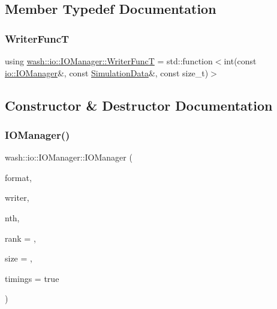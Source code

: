 \subsection{Member Typedef Documentation}
\mbox{\label{classwash_1_1io_1_1IOManager_aeda8c39a8e3c748efd1b3e0f8ae823ee}} 
\subsubsection{\texorpdfstring{Writer\+FuncT}{WriterFuncT}}
{\footnotesize\ttfamily using \mbox{\hyperlink{classwash_1_1io_1_1IOManager_aeda8c39a8e3c748efd1b3e0f8ae823ee}{wash\+::io\+::\+I\+O\+Manager\+::\+Writer\+FuncT}} =  std\+::function$<$int(const \mbox{\hyperlink{classwash_1_1io_1_1IOManager}{io\+::\+I\+O\+Manager}}\&, const \mbox{\hyperlink{structwash_1_1io_1_1SimulationData}{Simulation\+Data}}\&, const size\+\_\+t)$>$}



\subsection{Constructor \& Destructor Documentation}
\mbox{\label{classwash_1_1io_1_1IOManager_acea5f3f8a7f3e8eb1bfda9bc551b8435}} 
\subsubsection{\texorpdfstring{I\+O\+Manager()}{IOManager()}\hspace{0.1cm}{\footnotesize\ttfamily [1/4]}}
{\footnotesize\ttfamily wash\+::io\+::\+I\+O\+Manager\+::\+I\+O\+Manager (\begin{DoxyParamCaption}\item[{const std\+::string}]{format,  }\item[{\mbox{\hyperlink{classwash_1_1io_1_1IOManager_aeda8c39a8e3c748efd1b3e0f8ae823ee}{Writer\+FuncT}}}]{writer,  }\item[{const size\+\_\+t}]{nth,  }\item[{const size\+\_\+t}]{rank = {},  }\item[{const size\+\_\+t}]{size = {},  }\item[{const bool}]{timings = {\ttfamily true} }\end{DoxyParamCaption})\hspace{0.3cm}{\ttfamily [inline]}}

